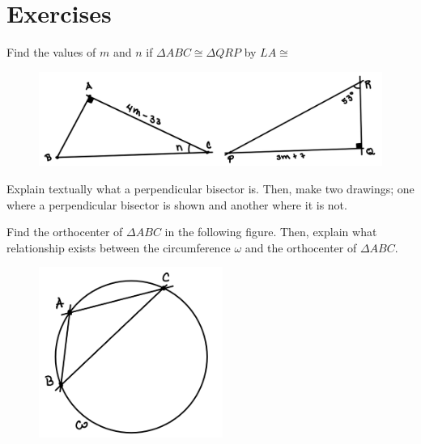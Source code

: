 \section{\large Exercises}

\begin{exer}
    Find the values of $m$ and $n$ if $\Delta ABC \cong \Delta QRP$ by $LA \cong$
    \begin{figure}[H]
        \center
        \includegraphics[width=15cm]{content/img1.png}
    \end{figure}
\end{exer}
\vspace{4cm}

\begin{exer}
    Explain textually what a perpendicular bisector is.
    Then, make two drawings; one where a perpendicular bisector is shown and another where it is not.
\end{exer}

\newpage

\begin{exer}
    Find the orthocenter of $\Delta ABC$ in the following figure.
    Then, explain what relationship exists between the circumference $\omega$ and the orthocenter of $\Delta ABC$.
    \begin{figure}[H]
        \center
        \includegraphics[width=6cm]{content/img2.png}
    \end{figure}
\end{exer}

